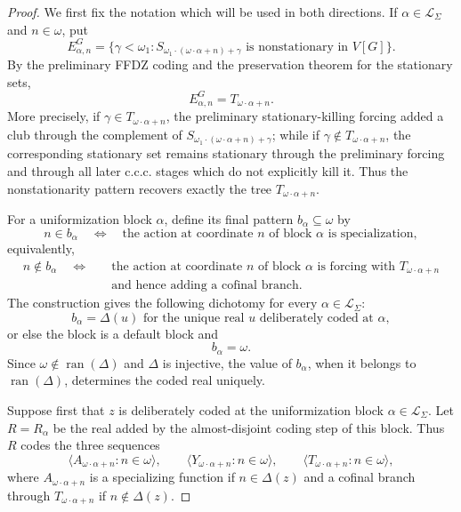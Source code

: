 \documentclass[10pt,a4paper]{amsart}
\begin{document}
\begin{proof}
We first fix the notation which will be used in both directions.  If
$\alpha\in\mathcal L_{\Sigma}$ and $n\in\omega$, put
\[
E^G_{\alpha,n}=\{\gamma<\omega_1:
S_{\omega_1\cdot(\omega\cdot\alpha+n)+\gamma}\text{ is nonstationary in }V[G]\}.
\]
By the preliminary FFDZ coding and the preservation theorem for the stationary sets,
\[
E^G_{\alpha,n}=T_{\omega\cdot\alpha+n}.                 \tag{1}
\]
More precisely, if $\gamma\in T_{\omega\cdot\alpha+n}$, the preliminary stationary-killing
forcing added a club through the complement of
$S_{\omega_1\cdot(\omega\cdot\alpha+n)+\gamma}$; while if
$\gamma\notin T_{\omega\cdot\alpha+n}$, the corresponding stationary set remains
stationary through the preliminary forcing and through all later c.c.c. stages which do
not explicitly kill it.  Thus the nonstationarity pattern recovers exactly the tree
$T_{\omega\cdot\alpha+n}$.

For a uniformization block $\alpha$, define its final pattern $b_\alpha\subseteq\omega$ by
\[
n\in b_\alpha
\quad\Longleftrightarrow\quad
\text{the action at coordinate }n\text{ of block }\alpha\text{ is specialization},
\]
equivalently,
\begin{align*}
   n\notin b_\alpha
\quad\Longleftrightarrow& \quad
\text{the action at coordinate }n\text{ of block }\alpha\text{ is forcing with }
T_{\omega\cdot\alpha+n} \\& \quad \text{and hence adding a cofinal branch}. 
\end{align*}
The construction gives the following dichotomy for every $\alpha\in\mathcal L_{\Sigma}$:
\[
b_\alpha=\Delta(u)\text{ for the unique real }u\text{ deliberately coded at }
\alpha,                                      \tag{2a}
\]
or else the block is a default block and
\[
b_\alpha=\omega.                             \tag{2b}
\]
Since $\omega\notin\operatorname{ran}(\Delta)$ and $\Delta$ is injective, the value of
$b_\alpha$, when it belongs to $\operatorname{ran}(\Delta)$, determines the coded real
uniquely.

Suppose first that $z$ is deliberately coded at the uniformization block
$\alpha\in\mathcal L_{\Sigma}$.  Let $R=R_\alpha$ be the real added by the
almost-disjoint coding step of this block.  Thus $R$ codes the three sequences
\[
\langle A_{\omega\cdot\alpha+n}:n\in\omega\rangle,
\qquad
\langle Y_{\omega\cdot\alpha+n}:n\in\omega\rangle,
\qquad
\langle T_{\omega\cdot\alpha+n}:n\in\omega\rangle,
\]
where $A_{\omega\cdot\alpha+n}$ is a specializing function if $n\in\Delta(z)$ and a
cofinal branch through $T_{\omega\cdot\alpha+n}$ if $n\notin\Delta(z)$.


\end{proof}
\end{document}
